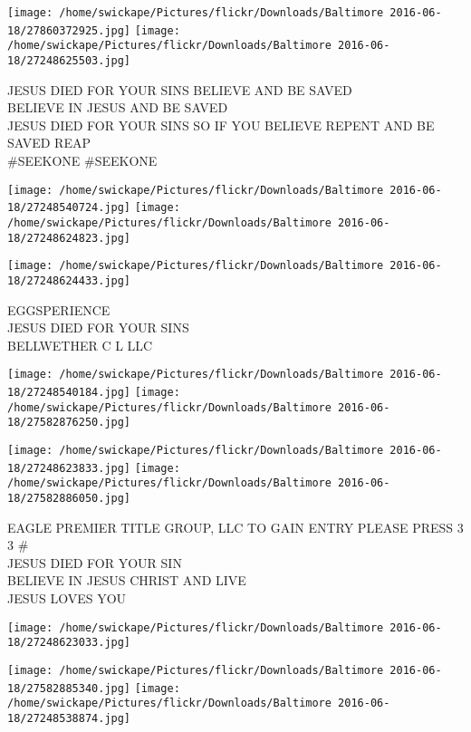 \documentclass[10pt,letterpaper]{article}
\begin{document}
\texttt{[image: /home/swickape/Pictures/flickr/Downloads/Baltimore 2016-06-18/27860372925.jpg]}
\texttt{[image: /home/swickape/Pictures/flickr/Downloads/Baltimore 2016-06-18/27248625503.jpg]}

JESUS DIED FOR YOUR SINS BELIEVE AND BE SAVED\\
BELIEVE IN JESUS AND BE SAVED\\
JESUS DIED FOR YOUR SINS SO IF YOU BELIEVE REPENT AND BE SAVED REAP\\
\#SEEKONE \#SEEKONE\\
\pagebreak

\texttt{[image: /home/swickape/Pictures/flickr/Downloads/Baltimore 2016-06-18/27248540724.jpg]}
\texttt{[image: /home/swickape/Pictures/flickr/Downloads/Baltimore 2016-06-18/27248624823.jpg]}

\vspace{0.25in}
\texttt{[image: /home/swickape/Pictures/flickr/Downloads/Baltimore 2016-06-18/27248624433.jpg]}

EGGSPERIENCE\\
JESUS DIED FOR YOUR SINS\\
BELLWETHER C L LLC\\
\pagebreak

\texttt{[image: /home/swickape/Pictures/flickr/Downloads/Baltimore 2016-06-18/27248540184.jpg]}
\texttt{[image: /home/swickape/Pictures/flickr/Downloads/Baltimore 2016-06-18/27582876250.jpg]}

\texttt{[image: /home/swickape/Pictures/flickr/Downloads/Baltimore 2016-06-18/27248623833.jpg]}
\texttt{[image: /home/swickape/Pictures/flickr/Downloads/Baltimore 2016-06-18/27582886050.jpg]}

EAGLE PREMIER TITLE GROUP, LLC TO GAIN ENTRY PLEASE PRESS 3 3 \#\\
JESUS DIED FOR YOUR SIN\\
BELIEVE IN JESUS CHRIST AND LIVE\\
JESUS LOVES YOU\\
\pagebreak

\texttt{[image: /home/swickape/Pictures/flickr/Downloads/Baltimore 2016-06-18/27248623033.jpg]}

\vspace{0.25in}
\texttt{[image: /home/swickape/Pictures/flickr/Downloads/Baltimore 2016-06-18/27582885340.jpg]}
\texttt{[image: /home/swickape/Pictures/flickr/Downloads/Baltimore 2016-06-18/27248538874.jpg]}
\end{document}
